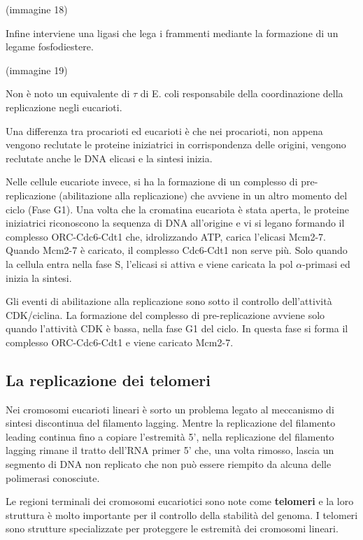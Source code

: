 \documentclass[11pt]{book}
\begin{document}
(immagine 18)

Infine interviene una ligasi che lega i frammenti mediante la formazione
di un legame fosfodiestere.

(immagine 19)

Non è noto un equivalente di \(\tau\) di E. coli responsabile della
coordinazione della replicazione negli eucarioti.

Una differenza tra procarioti ed eucarioti è che nei procarioti, non
appena vengono reclutate le proteine iniziatrici in corrispondenza delle
origini, vengono reclutate anche le DNA elicasi e la sintesi inizia.

Nelle cellule eucariote invece, si ha la formazione di un complesso di
pre-replicazione (abilitazione alla replicazione) che avviene in un
altro momento del ciclo (Fase G1). Una volta che la cromatina eucariota
è stata aperta, le proteine iniziatrici riconoscono la sequenza di DNA
all'origine e vi si legano formando il complesso ORC-Cdc6-Cdt1 che,
idrolizzando ATP, carica l'elicasi Mcm2-7. Quando Mcm2-7 è caricato, il
complesso Cdc6-Cdt1 non serve più. Solo quando la cellula entra nella
fase S, l'elicasi si attiva e viene caricata la pol \(\alpha\)-primasi
ed inizia la sintesi.

Gli eventi di abilitazione alla replicazione sono sotto il controllo
dell'attività CDK/ciclina. La formazione del complesso di
pre-replicazione avviene solo quando l'attività CDK è bassa, nella fase
G1 del ciclo. In questa fase si forma il complesso ORC-Cdc6-Cdt1 e viene
caricato Mcm2-7.

\subsection{La replicazione dei
telomeri}\label{la-replicazione-dei-telomeri}

Nei cromosomi eucarioti lineari è sorto un problema legato al meccanismo
di sintesi discontinua del filamento lagging. Mentre la replicazione del
filamento leading continua fino a copiare l'estremità 5', nella
replicazione del filamento lagging rimane il tratto dell'RNA primer 5'
che, una volta rimosso, lascia un segmento di DNA non replicato che non
può essere riempito da alcuna delle polimerasi conosciute.

Le regioni terminali dei cromosomi eucariotici sono note come
\textbf{telomeri} e la loro struttura è molto importante per il
controllo della stabilità del genoma. I telomeri sono strutture
specializzate per proteggere le estremità dei cromosomi lineari.
\end{document}
